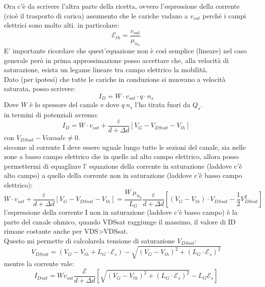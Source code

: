 Ora c'è da scrivere l'altra parte della ricetta, ovvero l'espressione della corrente (cioè il trasporto di carica) assumento che le cariche vadano a $v_{sat}$ perchè i campi elettrici sono molto alti.
in particolare:
\begin{equation}
    \mathcal{E}_{th}=\dfrac{v_{sat}}{\mu_{n_{0}}}
\end{equation}
E' importante ricordare che quest'equazione non è così semplice (lineare) nel caso generale però in prima approssimazione posso accettare che, alla velocità di saturazione, esista un legame lineare tra campo elettrico la mobilità.\\
Dato (per ipotesi) che tutte le cariche in conduzione si muovano a velocità saturata, posso scrivere:
\begin{equation}
    I_D=W \cdot v_{sat} \cdot q \cdot n_s
\end{equation}
Dove $W$ è lo spessore del canale e 
dove $q\ n_s$ l'ho tirata fuori da $Q_s$.\\
in termini di potenziali avremo:
\begin{equation}
    I_D=W \cdot v_{sat} + \dfrac{\varepsilon}{d+\Delta d} \left[ V_G - V_{DSsat} - V_{th}\right]
\end{equation}
con $V_{DSsat} - Vcanale \neq 0$.\\
siccome al corrente I deve essere uguale lungo tutte le sezioni del canale, sia nelle zone a basso campo elettrico che in quelle ad alto campo elettrico, allora posso permettermi di equagliare l' equazione della corrente in saturazione (laddove c'è alto campo) a quello della corrente non in saturazione (laddove c'è basso campo elettrico):
\begin{equation}
    W \cdot v_{sat} + \dfrac{\varepsilon}{d+\Delta d} \left[ V_G - V_{DSsat} - V_{th}\right] = \dfrac{W\ \mu_{n_0}}{L_G}\dfrac{\varepsilon}{d+\Delta d} \left[ (V_G -V_{th}) \cdot V_{DSsat}-\dfrac{1}{2}V_{DSsat}^2\right]
\end{equation}
l'espressione della corrente I non in saturazione (laddove c'è basso campo) è la parte del canale ohmico, quando VDSsat raggiunge il massimo, il valore di ID rimane costante anche per VDS>VDSsat.\\
Questo mi permette di calcolarela tensione di saturazione $V_{DSsat}$:
\begin{equation}
    V_{DSsat}=(V_G-V_{th}+L_G\cdot \mathcal{E}_s)-\sqrt{(V_G-V_{th})^2+(L_G \cdot \mathcal{E}_s)^2}
\end{equation}
mentre la corrente vale:
\begin{equation}
    I_{Dsat}=W v_{sat}\dfrac{\mathcal{E}}{d+\Delta d} \left[ \sqrt{(V_G-V_{th})^2+(L_G \cdot \mathcal{E}_s)^2} - L_G\mathcal{E}_s\right]
\end{equation}
